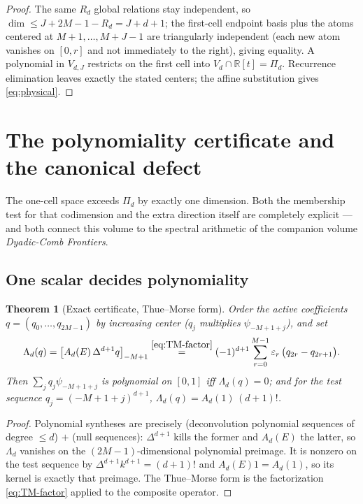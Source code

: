 \documentclass[11pt,oneside]{article}
\numberwithin{equation}{section}
\newtheorem{theorem}{Theorem}[section]
\theoremstyle{definition}
\theoremstyle{remark}
\newcommand{\R}{\mathbb R}
\newcommand{\eps}{\varepsilon}
\newcommand{\PiD}{\Pi_d}
\begin{document}
\begin{proof}
The same $R_d$ global relations stay independent, so
$\dim\le J+2M-1-R_d=J+d+1$; the first-cell endpoint basis plus the
atoms centered at $M+1,\dots,M+J-1$ are triangularly independent
(each new atom vanishes on $[0,r]$ and not immediately to the right),
giving equality.  A polynomial in $V_{d,J}$ restricts on the first
cell into $V_d\cap\R[t]=\PiD$.  Recurrence elimination leaves exactly
the stated centers; the affine substitution gives
\eqref{eq:physical}.
\end{proof}

\section{The polynomiality certificate and the canonical defect}
\label{sec:certificate}

The one-cell space exceeds $\PiD$ by exactly one dimension.  Both the
membership test for that codimension and the extra direction itself
are completely explicit --- and both connect this volume to the
spectral arithmetic of the companion volume \emph{Dyadic-Comb
Frontiers}.

\subsection{One scalar decides polynomiality}

\begin{theorem}[Exact certificate, Thue--Morse form]
\label{thm:certificate}
Order the active coefficients $q=(q_0,\dots,q_{2M-1})$ by increasing
center ($q_j$ multiplies $\psi_{-M+1+j}$), and set
\begin{equation}
 \Lambda_d(q)
 =\bigl[A_d(E)\,\Delta^{d+1}q\bigr]_{-M+1}
 \overset{\eqref{eq:TM-factor}}{=}
 (-1)^{d+1}\sum_{r=0}^{M-1}\eps_r\,
 \bigl(q_{2r}-q_{2r+1}\bigr).
 \label{eq:Lambda}
\end{equation}
Then $\sum_jq_j\psi_{-M+1+j}$ is polynomial on $[0,1]$ \emph{iff}
$\Lambda_d(q)=0$; and for the test sequence $q_j=(-M+1+j)^{d+1}$,
$\Lambda_d(q)=A_d(1)\,(d+1)!$.
\end{theorem}

\begin{proof}
Polynomial syntheses are precisely (deconvolution polynomial
sequences of degree $\le d$) $+$ (null sequences):
$\Delta^{d+1}$ kills the former and $A_d(E)$ the latter, so
$\Lambda_d$ vanishes on the $(2M-1)$-dimensional polynomial
preimage.  It is nonzero on the test sequence by
$\Delta^{d+1}k^{d+1}=(d+1)!$ and $A_d(E)1=A_d(1)$, so its kernel is
exactly that preimage.  The Thue--Morse form is the factorization
\eqref{eq:TM-factor} applied to the composite operator.
\end{proof}
\end{document}
